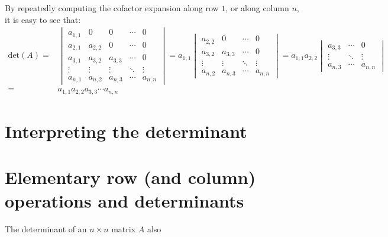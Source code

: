 \documentclass{article}
\begin{document}
By repeatedly computing the cofactor expansion along row \(1\), or along column \(n\), it is easy to see that: 
\begin{align*}
\text{det}(A) = & \begin{vmatrix} a_{1,1} & 0 & 0 & \cdots & 0 \\ a_{2,1} & a_{2,2} & 0 & \cdots & 0 \\ a_{3,1} & a_{3,2} & a_{3,3} & \cdots & 0 \\ \vdots & \vdots & \vdots & \ddots & \vdots \\ a_{n,1} & a_{n,2} & a_{n,3} & \cdots & a_{n,n} \end{vmatrix} 
= a_{1,1}\begin{vmatrix} a_{2,2} & 0 & \cdots & 0 \\ a_{3,2} & a_{3,3} & \cdots & 0 \\ \vdots & \vdots & \ddots & \vdots \\ a_{n,2} & a_{n,3} & \cdots & a_{n,n} \end{vmatrix} 
= a_{1,1}a_{2,2}\begin{vmatrix} a_{3,3} & \cdots & 0 \\ \vdots & \ddots & \vdots \\ a_{n,3} & \cdots & a_{n,n} \end{vmatrix} \\
= & a_{1,1}a_{2,2}a_{3,3} \cdots a_{n,n}
\end{align*}



\section*{Interpreting the determinant}




\section*{Elementary row (and column) operations and determinants}

The determinant of an \(n \times n\) matrix \(A\) also 
\end{document}

